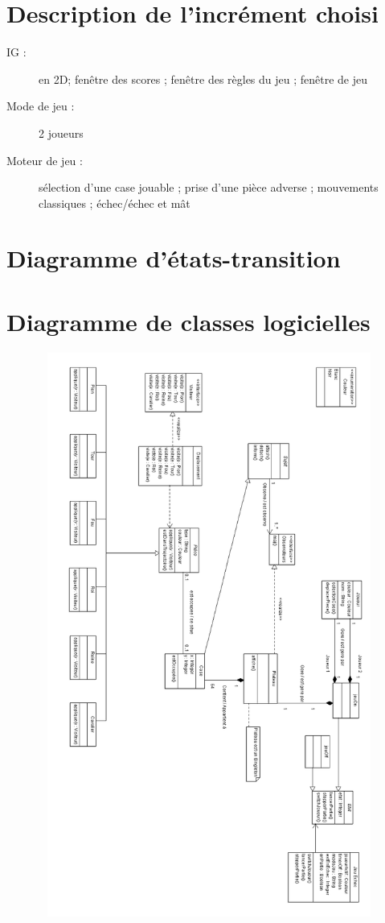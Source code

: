 \documentclass[11pt,a4paper]{report}
\begin{document}
\section*{Description de l'incrément choisi}
\begin{description}
    \item[IG :] en 2D; fenêtre des scores ; fenêtre des règles du jeu ; fenêtre de jeu
\item[Mode de jeu :] 2 joueurs
\item[Moteur de jeu :] sélection d'une case jouable ; prise d'une pièce adverse ; mouvements classiques ; échec/échec et mât 

\end{description}
\section*{Diagramme d'états-transition}

\clearpage

\section*{Diagramme de classes logicielles}
\begin{figure}[ht]
\begin{center}
  \includegraphics[width = 35em, height=50em]{images/classe/Diagrammedeclasseslogiciel.png}
\end{center}
\end{figure}
\end{document}
